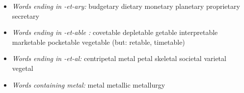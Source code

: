 \bgroup \em
\begin{itemize}
\item \emph{Words ending in -et-ary:} 
budgetary dietary monetary planetary proprietary secretary

\item \emph{Words ending in -et-able :}
covetable depletable getable interpretable marketable pocketable vegetable (but: retable, timetable)

\item \emph{Words ending in -et-al:} centripetal 
metal petal skeletal societal varietal vegetal

\item \emph{Words containing metal:} metal metallic metallurgy
\end{itemize}
\egroup
